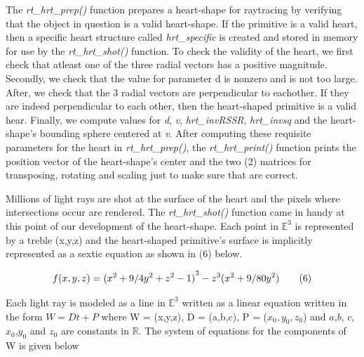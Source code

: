 \hspace{30} The   \textit{rt\_hrt\_prep()}   function   prepares   a   heart-­shape   for   ray­tracing   by  
verifying   that   the   object   in   question   is   a   valid   heart-­shape.   If   the   primitive   is   a  
valid   heart,   then   a   specific   heart   structure   called   \textit{hrt\_specific}   is   created   and  
stored   in   memory   for   use   by   the   \textit{rt\_hrt\_shot()}   function.   To   check   the   validity   of  
the   heart,   we   first   check   that   atleast   one   of   the   three   radial   vectors   has   a  
positive   magnitude.   Secondly,   we   check   that   the   value   for   parameter   d   is  
non­zero   and   is   not   too   large.   After,   we   check   that   the   3   radial   vectors   are  
perpendicular   to   eachother.   If   they   are   indeed   perpendicular   to   each   other,   then  
the   heart­-shaped   primitive   is   a   valid   hear.   Finally,   we   compute   values   for   \textit{d},   \textit{v},  
\textit{hrt\_invRSSR},   \textit{hrt\_invsq}   and   the   heart-shape's   bounding   sphere   centered   at   \textit{v}.   After  
computing   these   requisite   parameters   for   the   heart   in   \textit{rt\_hrt\_prep()},   the  
\textit{rt\_hrt\_print()}   function   prints   the   position   vector   of   the   heart-­shape's   center   and  
the   two   (2)   matrices   for   transposing,   rotating   and   scaling   just   to   make   sure   that  
are correct.

\hspace{30} Millions   of   light   rays   are   shot   at   the   surface   of   the   heart   and   the   pixels  
where   intersections   occur   are   rendered.   The   \textit{rt\_hrt\_shot()}   function   came   in  
handy   at   this   point   of   our   development   of   the   heart-­shape.   Each   point   in $ \mathbb{E}^3 $
   is   represented   by   a   treble   (x,y,z)   and   the heart-­shaped   primitive's   surface   is   implicitly   represented   as   a   sextic   equation as shown in (6) below.  

\begin{equation*}
\centering
  ­­­­­­­­­­­­­­f(x,y,z) = {(x^2 + 9/4y^2 + z^2 - 1 )}^3 - z^3(x^2 + 9/80y^2) \tag{6}
\end{equation*}

Each   light   ray   is   modeled   as   a   line   in   $ \mathbb{E}^3 $   written  
as   a   linear   equation   written   in   the   form   $W   =   Dt   +   P$   where   W   =   (x,y,z),   D   =   (a,b,c),  
P   =   ($x_0,y_0 ,z_0$) and $a$,$ b$, $ c$,$x_0$,$y_0$ and $z_0$ are constants in $ \mathbb{R} $.   The   system   of  
equations for the components of W is given below

